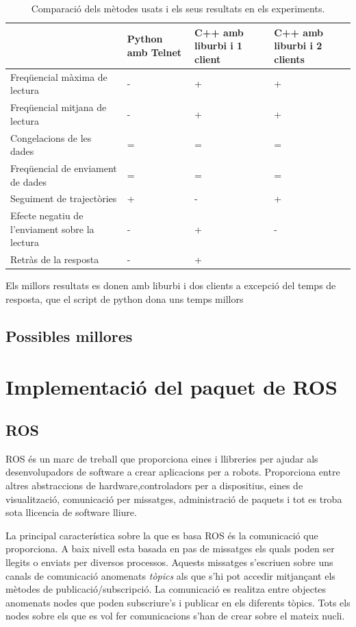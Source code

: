 \documentclass[12pt,a4paper,final,twoside]{article}
\begin{document}
\begin{table}[H]
\begin{center}
\begin{tabulary}{\textwidth}{|p{4cm}|p{3cm}|p{3cm}|p{3cm}|}
\hline

&\textbf{Python amb Telnet} & \textbf{C++ amb liburbi i 1 client} & \textbf{C++ amb liburbi i 2 clients} \\ \hline
Freqüencial màxima de lectura & - & + & + \\ \hline
Freqüencial mitjana de lectura & - & + & +  \\ \hline
Congelacions de les dades & = & = &= \\ \hline
Freqüencial de enviament de dades & = & = & = \\ \hline
Seguiment de trajectòries & + & - & + \\ \hline
Efecte negatiu de l'enviament sobre la lectura& - & + & - \\ \hline
Retràs de la resposta & - & + & \\ \hline
\end{tabulary}
\end{center}
\caption{Comparació dels mètodes usats i els seus resultats en els experiments.\label{comp}}
\end{table}
Els millors resultats es donen amb liburbi i dos clients a excepció del temps de resposta, que el script de python dona uns temps millors
\subsection{Possibles millores}
\section{Implementació del paquet de ROS}
\subsection{ROS}
\label{ros}
ROS és un marc de treball que proporciona eines i llibreries per ajudar als desenvolupadors de software a crear aplicacions per a robots. Proporciona entre altres abstraccions de hardware,controladors per a dispositius, eines de visualització, comunicació per missatges, administració de paquets i tot es troba sota llicencia de software lliure.

La principal característica sobre la que es basa ROS és la comunicació que proporciona. A baix nivell esta basada en pas de missatges els quals poden ser llegits o enviats per diversos processos. Aquests missatges s'escriuen sobre uns canals de comunicació anomenats \textit{tòpics} als que s'hi pot accedir mitjançant els mètodes de publicació/subscripció. La comunicació es realitza entre objectes anomenats nodes que poden subscriure's i publicar en els diferents tòpics. Tots els nodes sobre els que es vol fer comunicacions s'han de crear sobre el mateix nucli. 
\end{document}
